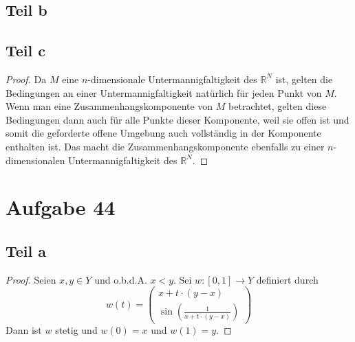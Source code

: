 \documentclass[10pt,a4paper]{article}
\begin{document}
\subsection{Teil b}

\subsection{Teil c}
\begin{proof}
  Da $M$ eine $n$-dimensionale Untermannigfaltigkeit des $\mathbb{R}^{N}$ ist, gelten die Bedingungen an einer Untermannigfaltigkeit natürlich für jeden Punkt von $M$.
  Wenn man eine Zusammenhangskomponente von $M$ betrachtet, gelten diese Bedingungen dann auch für alle Punkte dieser Komponente, weil sie offen ist und somit die geforderte offene Umgebung auch vollständig in der Komponente enthalten ist.
  Das macht die Zusammenhangskomponente ebenfalls zu einer $n$-dimensionalen Untermannigfaltigkeit des $\mathbb{R}^{N}$.
\end{proof}

\section{Aufgabe 44}

\subsection{Teil a}
\begin{proof}
  Seien $x, y \in Y$ und o.b.d.A. $x < y$.
  Sei $w : [0, 1] \rightarrow Y$ definiert durch
  \begin{equation}
    w(t) = \begin{pmatrix}
      x + t \cdot (y - x)\\
      \sin(\frac{1}{x + t \cdot (y - x)})
    \end{pmatrix}
  \end{equation}
  Dann ist $w$ stetig und $w(0) = x$ und $w(1) = y$.
\end{proof}
\end{document}
